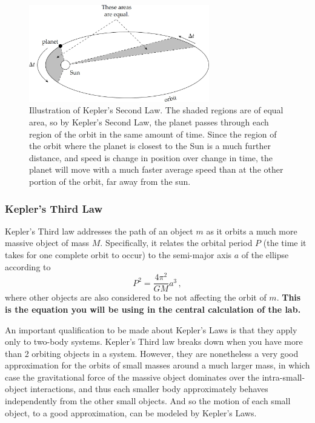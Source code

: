 \begin{figure}
	\centering
	\includegraphics[width=0.7\textwidth]{galactic-center/keplers-2nd-ellipse.png}
	\caption{Illustration of Kepler’s Second Law. The shaded regions are of equal area, so by Kepler’s Second Law, the
		planet passes through each region of the orbit in the same amount of time. Since the region of the orbit
		where the planet is closest to the Sun is a much further distance, and speed is change in position over
		change in time, the planet will move with a much faster average speed than at the other portion of the
		orbit, far away from the sun.}\label{gc:fig:keplers-2nd-ellipse}
\end{figure}

\subsubsection{Kepler's Third Law}

Kepler’s Third law addresses the path of an object $m$ as it orbits a much more massive object of mass $M$. Specifically, it relates the orbital period $P$ (the time it takes for one complete orbit to occur) to the semi-major axis $a$ of the ellipse according to
\begin{equation}\label{gc:eq:kepler-3}
 P^2 = \frac{4 \pi^2}{G M} a^3 \,,
\end{equation}
where other objects are also considered to be not affecting the orbit of $m$. \textbf{This is the
	equation you will be using in the central calculation of the lab.}

An important qualification to be made about Kepler’s Laws is that they apply only to two-body
systems. Kepler’s Third law breaks down when you have more than 2 orbiting objects in a system.
However, they are nonetheless a very good approximation for the orbits of small masses around a much
larger mass, in which case the gravitational force of the massive object dominates over the intra-small-
object interactions, and thus each smaller body approximately behaves independently from the other
small objects. And so the motion of each small object, to a good approximation, can be modeled by
Kepler’s Laws.


